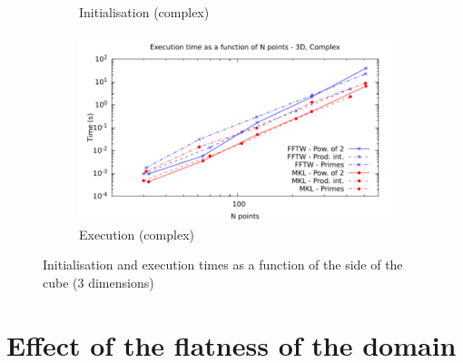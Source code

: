 \documentclass[12pt, a4paper]{article} \setlength{\textheight}{24cm}
\begin{document}
\begin{figure}[H]
\begin{subfigure}{.5\textwidth}
    \caption{Initialisation (complex)}
    \label{3DCI}
  \end{subfigure}%
  \begin{subfigure}{.5\textwidth}
    \centering
    \includegraphics[width=.9\linewidth]{graphs/3d-exec-c.pdf}
    \caption{Execution (complex)}
    \label{3DC}
  \end{subfigure}
  \caption{Initialisation and execution times as a function of the
    side of the cube (3 dimensions)}
  \label{3D}
\end{figure}

\section{Effect of the flatness of the domain}\label{Sec:FLATNESS}
\end{document}
